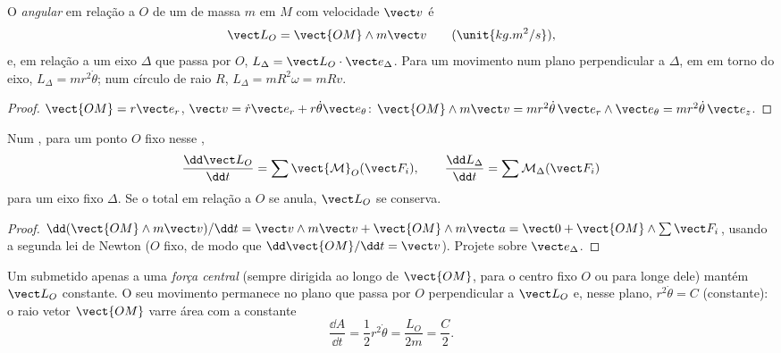 \begin{definition}\label{def:b1:angular-momentum:L}
O \emph{ angular} em relação a $O$ de um  de massa $m$ em $M$
com velocidade $\vect v$ é
\[
\vect L_O = \vect{OM}\wedge m\vect v \qquad (\unit{kg.m^2/s}),
\]
e, em relação a um eixo $\Delta$ que passa por $O$, $L_\Delta = \vect L_O\cdot\vect e_\Delta$.
Para um movimento num plano perpendicular a $\Delta$, em 
em torno do eixo, $L_\Delta = mr^2\dot\theta$; num círculo de raio $R$,
$L_\Delta = mR^2\omega = mRv$.
\end{definition}

\begin{proof}
$\vect{OM} = r\vect e_r$, $\vect v = \dot r\vect e_r + r\dot\theta\vect e_\theta$:
$\vect{OM}\wedge m\vect v = mr^2\dot\theta\,\vect e_r\wedge\vect e_\theta = mr^2\dot\theta\,\vect e_z$.
\end{proof}

\begin{theorem}\label{thm:b1:angular-momentum:theorem}
Num , para um ponto $O$ fixo nesse ,
\[
\frac{\dd\vect L_O}{\dd t} = \sum\vect{\mathcal M}_O(\vect F_i),
\qquad
\frac{\dd L_\Delta}{\dd t} = \sum\mathcal M_\Delta(\vect F_i)
\]
para um eixo fixo $\Delta$. Se o  total em relação a $O$ se anula,
$\vect L_O$ se conserva.
\end{theorem}

\begin{proof}
$\dd(\vect{OM}\wedge m\vect v)/\dd t = \vect v\wedge m\vect v + \vect{OM}\wedge m\vect a
= \vect 0 + \vect{OM}\wedge\sum\vect F_i$, usando a segunda lei de Newton
($O$ fixo, de modo que $\dd\vect{OM}/\dd t = \vect v$). Projete sobre $\vect e_\Delta$.
\end{proof}

\begin{corollary}\label{cor:b1:angular-momentum:central}
Um  submetido apenas a uma \emph{força central} (sempre dirigida
ao longo de $\vect{OM}$, para o centro fixo $O$ ou para longe dele) mantém
$\vect L_O$ constante. O seu movimento permanece no plano que passa por $O$
perpendicular a $\vect L_O$ e, nesse plano, $r^2\dot\theta = C$
(constante): o raio vetor $\vect{OM}$ varre área com a
\emph{} constante
\[
\frac{\dd A}{\dd t} = \frac12 r^2\dot\theta = \frac{L_O}{2m} = \frac{C}{2} .
\]
\end{corollary}

